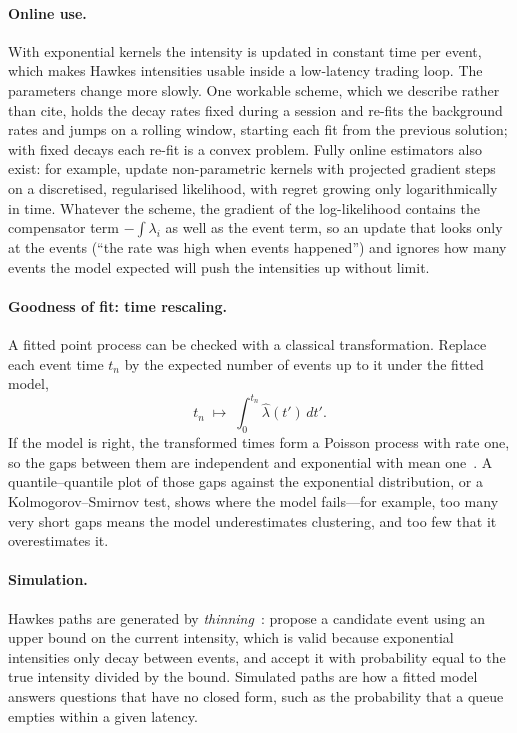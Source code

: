 \paragraph{Online use.} With exponential kernels the intensity is updated in constant time per event,
which makes Hawkes intensities usable inside a low-latency trading loop. The parameters change more
slowly. One workable scheme, which we describe rather than cite, holds the decay rates fixed during a
session and re-fits the background rates and jumps on a rolling window, starting each fit from the
previous solution; with fixed decays each re-fit is a convex problem. Fully online estimators also
exist: for example, \citet{yang2017online} update non-parametric kernels with projected gradient steps
on a discretised, regularised likelihood, with regret growing only logarithmically in time. Whatever
the scheme, the gradient of the log-likelihood contains the compensator term $-\int \lambda_i$ as well
as the event term, so an update that looks only at the events (``the rate was high when events
happened'') and ignores how many events the model expected will push the intensities up without limit.

\paragraph{Goodness of fit: time rescaling.} A fitted point process can be checked with a classical
transformation. Replace each event time $t_n$ by the expected number of events up to it under the
fitted model,
\[
  t_n \;\mapsto\; \int_0^{t_n} \widehat\lambda(t')\,dt' .
\]
If the model is right, the transformed times form
a Poisson process with rate one, so the gaps between them are independent and exponential with mean
one~\citep{ogata1988,brown2002}. A quantile--quantile plot of those gaps against the exponential
distribution, or a Kolmogorov--Smirnov test, shows where the model fails---for example, too many very
short gaps means the model underestimates clustering, and too few that it overestimates it.

\paragraph{Simulation.} Hawkes paths are generated by \emph{thinning}~\citep{ogata1981}: propose a
candidate event using an upper bound on the current intensity, which is valid because exponential
intensities only decay between events, and accept it with probability equal to the true intensity
divided by the bound. Simulated paths are how a fitted model answers questions that have no closed
form, such as the probability that a queue empties within a given latency.


